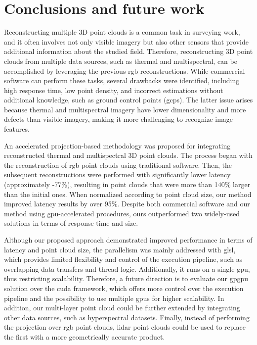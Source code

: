 \section{Conclusions and future work}

Reconstructing multiple 3D point clouds is a common task in surveying work, and it often involves not only visible imagery but also other sensors that provide additional information about the studied field. Therefore, reconstructing 3D point clouds from multiple data sources, such as thermal and multispectral, can be accomplished by leveraging the previous \acrshort{rgb} reconstructions. While commercial software can perform these tasks, several drawbacks were identified, including high response time, low point density, and incorrect estimations without additional knowledge, such as ground control points (\acrshort{gcp}s). The latter issue arises because thermal and multispectral imagery have lower dimensionality and more defects than visible imagery, making it more challenging to recognize image features.

An accelerated projection-based methodology was proposed for integrating reconstructed thermal and multispectral 3D point clouds. The process began with the reconstruction of \acrshort{rgb} point clouds using traditional software. Then, the subsequent reconstructions were performed with significantly lower latency (approximately -77\%), resulting in point clouds that were more than 140\% larger than the initial ones. When normalized according to point cloud size, our method improved latency results by over 95\%. Despite both commercial software and our method using \acrshort{gpu}-accelerated procedures, ours outperformed two widely-used solutions in terms of response time and size.

Although our proposed approach demonstrated improved performance in terms of latency and point cloud size, the parallelism was mainly addressed with \acrshort{glsl}, which provides limited flexibility and control of the execution pipeline, such as overlapping data transfers and thread logic. Additionally, it runs on a single \acrshort{gpu}, thus restricting scalability. Therefore, a future direction is to evaluate our \acrshort{gpgpu} solution over the \acrshort{cuda} framework, which offers more control over the execution pipeline and the possibility to use multiple \acrshort{gpu}s for higher scalability. In addition, our multi-layer point cloud could be further extended by integrating other data sources, such as hyperspectral datasets. Finally, instead of performing the projection over \acrshort{rgb} point clouds, \acrshort{lidar} point clouds could be used to replace the first with a more geometrically accurate product.

